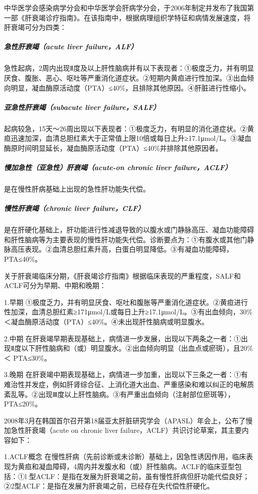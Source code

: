 中华医学会感染病学分会和中华医学会肝病学分会，于2006年制定并发布了我国第一部《肝衰竭诊疗指南》。在该指南中，根据病理组织学特征和病情发展速度，将肝衰竭可分为四类：

\subparagraph{急性肝衰竭（acute liver failure，ALF）}

急性起病，2周内出现Ⅱ度及以上肝性脑病并有以下表现者：①极度乏力，并有明显厌食、腹胀、恶心、呕吐等严重消化道症状。②短期内黄疸进行性加深。③出血倾向明显，凝血酶原活动度（PTA）≤40\%，且排除其他原因。④肝脏进行性缩小。

\subparagraph{亚急性肝衰竭（subacute liver failure，SALF）}

起病较急，15天～26周出现以下表现者：①极度乏力，有明显的消化道症状。②黄疸迅速加深，血清总胆红素大于正常值上限10倍或每日上升≥17.1μmol/L。③凝血酶原时间明显延长，凝血酶原活动度（PTA）≤40\%并排除其他原因者。

\subparagraph{慢加急性（亚急性）肝衰竭（acute-on chronic liver failure，ACLF）}

是在慢性肝病基础上出现的急性肝功能失代偿。

\subparagraph{慢性肝衰竭（chronic liver failure，CLF）}

是在肝硬化基础上，肝功能进行性减退导致的以腹水或门静脉高压、凝血功能障碍和肝性脑病等为主要表现的慢性肝功能失代偿。诊断要点为：①有腹水或其他门静脉高压表现。②血清总胆红素升高，白蛋白明显降低。③有凝血功能障碍，PTA≤40\%。

关于肝衰竭临床分期，《肝衰竭诊疗指南》根据临床表现的严重程度，SALF和ACLF可分为早期、中期和晚期：

1.早期
①极度乏力，并有明显厌食、呕吐和腹胀等严重消化道症状。②黄疸进行性加深，血清总胆红素≥171μmol/L或每日上升≥17.1μmol/L。③有出血倾向，30\%
＜凝血酶原活动度（PTA）≤40\%。④未出现肝性脑病或明显腹水。

2.中期
在肝衰竭早期表现基础上，病情进一步发展，出现以下两条之一者：①出现Ⅱ度以下肝性脑病和（或）明显腹水。②出血倾向明显（出血点或瘀斑），且20\%
＜ PTA≤30\%。

3.晚期
在肝衰竭中期表现基础上，病情进一步加重，出现以下三条之一者：①有难治性并发症，例如肝肾综合征、上消化道大出血、严重感染和难以纠正的电解质紊乱等。②出现Ⅲ度以上肝性脑病。③有严重出血倾向（注射部位瘀斑等），PTA≤20\%。

2008年3月在韩国首尔召开第18届亚太肝脏研究学会（APASL）年会上，公布了慢加急性肝衰竭（acute
on chronic liver failure，ACLF）共识讨论草案，其主要内容如下：

1.ACLF概念
在慢性肝病（先前诊断或未诊断）基础上，因急性诱因作用，临床表现为黄疸和凝血障碍，4周内并发腹水和（或）肝性脑病。ACLF的临床亚型包括：①l
型ACLF：是指在发展为肝衰竭之前，虽有慢性肝病但肝功能代偿良好；②2型ACLF：是指在发展为肝衰竭之前，已经存在失代偿性肝硬化。

